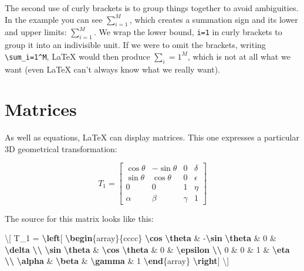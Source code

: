 \documentclass[
]{book}
\newenvironment{Shaded}{\begin{snugshade}}{\end{snugshade}}
\newcommand{\ExtensionTok}[1]{#1}
\newcommand{\KeywordTok}[1]{\textcolor[rgb]{0.13,0.29,0.53}{\textbf{#1}}}
\newcommand{\NormalTok}[1]{#1}
\newcommand{\SpecialCharTok}[1]{\textcolor[rgb]{0.81,0.36,0.00}{\textbf{#1}}}
\newcommand{\SpecialStringTok}[1]{\textcolor[rgb]{0.31,0.60,0.02}{#1}}
\begin{document}
The second use of curly brackets is to group things together to avoid ambiguities. In the example you can see \(\sum_{i=1}^M\), which creates a summation sign and its lower and upper limits: \(\sum_{i=1}^{M}\). We wrap the lower bound, \texttt{i=1} in curly brackets to group it into an indivisible unit. If we were to omit the brackets, writing \texttt{\textbackslash{}sum\_i=1\^{}M}, LaTeX would then produce \(\sum_i=1^M\), which is not at all what we want (even LaTeX can't always know what we really want).

\section{Matrices}\label{matrix}

As well as equations, LaTeX can display matrices. This one expresses a particular 3D geometrical transformation:

\[ T_1 = \left[
 \begin{array}{cccc}
 \cos \theta & -\sin \theta & 0 & \delta \\
 \sin \theta  & \cos \theta & 0 & \epsilon \\
 0 & 0 & 1 & \eta \\
 \alpha & \beta & \gamma & 1
 \end{array}
 \right] \]

The source for this matrix looks like this:

\begin{Shaded}
\begin{Highlighting}[]
   \SpecialStringTok{\textbackslash{}[ T\_1 = }\SpecialCharTok{\textbackslash{}left}\SpecialStringTok{[}
\SpecialStringTok{    }\KeywordTok{\textbackslash{}begin}\NormalTok{\{}\ExtensionTok{array}\NormalTok{\}}\SpecialStringTok{\{cccc\}}
\SpecialStringTok{    }\SpecialCharTok{\textbackslash{}cos}\SpecialStringTok{ }\SpecialCharTok{\textbackslash{}theta}\SpecialStringTok{ \& {-}}\SpecialCharTok{\textbackslash{}sin}\SpecialStringTok{ }\SpecialCharTok{\textbackslash{}theta}\SpecialStringTok{ \& 0 \& }\SpecialCharTok{\textbackslash{}delta}\SpecialStringTok{ }\SpecialCharTok{\textbackslash{}\textbackslash{}}
\SpecialStringTok{    }\SpecialCharTok{\textbackslash{}sin}\SpecialStringTok{ }\SpecialCharTok{\textbackslash{}theta}\SpecialStringTok{  \& }\SpecialCharTok{\textbackslash{}cos}\SpecialStringTok{ }\SpecialCharTok{\textbackslash{}theta}\SpecialStringTok{ \& 0 \& }\SpecialCharTok{\textbackslash{}epsilon}\SpecialStringTok{ }\SpecialCharTok{\textbackslash{}\textbackslash{}}
\SpecialStringTok{    0 \& 0 \& 1 \& }\SpecialCharTok{\textbackslash{}eta}\SpecialStringTok{ }\SpecialCharTok{\textbackslash{}\textbackslash{}}
\SpecialStringTok{    }\SpecialCharTok{\textbackslash{}alpha}\SpecialStringTok{ \& }\SpecialCharTok{\textbackslash{}beta}\SpecialStringTok{ \& }\SpecialCharTok{\textbackslash{}gamma}\SpecialStringTok{ \& 1}
\SpecialStringTok{    }\KeywordTok{\textbackslash{}end}\NormalTok{\{}\ExtensionTok{array}\NormalTok{\}}
\SpecialStringTok{    }\SpecialCharTok{\textbackslash{}right}\SpecialStringTok{] \textbackslash{}]}
\end{Highlighting}
\end{Shaded}
\end{document}
